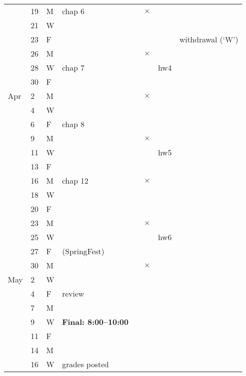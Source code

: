 \documentclass{article}
\begin{document}
\begin{tabular*}{0.99\textwidth}{%
    p{}%
    p{}%
    p{}%
    |p{}%
    |p{}%
    |p{}%
    |p{}%
    |p{}}
\hline
& 19 & M & chap 6& &$\times$ & &\\
& 21 & W & & & & &\\
& 23 & F & & & & &{\small withdrawal (`W')}\\
\hline
& 26 & M & & &$\times$ & &\\
& 28 & W & chap 7& & & hw4&\\
& 30 & F & & & & &\\
\hline
Apr
&  2 & M & & &$\times$ & &\\
&  4 & W & & & & &\\
&  6 & F & chap 8& & & & \\
\hline
&  9 & M & & &$\times$ & & \\
& 11 & W & & & & hw5&\\
& 13 & F & & & & & \\
\hline
& 16 & M & chap 12& &$\times$ & &\\
& 18 & W & & & & &\\
& 20 & F & & & & & \\
\hline
& 23 & M & & &$\times$ & &\\
& 25 & W & & & & hw6&\\
& 27 & F & (SpringFest)& & & &\\
\hline
& 30 & M & & &$\times$ & & \\
May
& 2  & W & & & & &\\
& 4  & F & review & & & &\\
\hline
& 7  & M & & & & &\\
& 9  & W & \textbf{Final: 8:00--10:00}& & & &\\
& 11 & F & & & & &\\
\hline
& 14 & M & & & & &\\
& 16 & W & grades posted& & & &\\
\end{tabular*}
\end{document}
